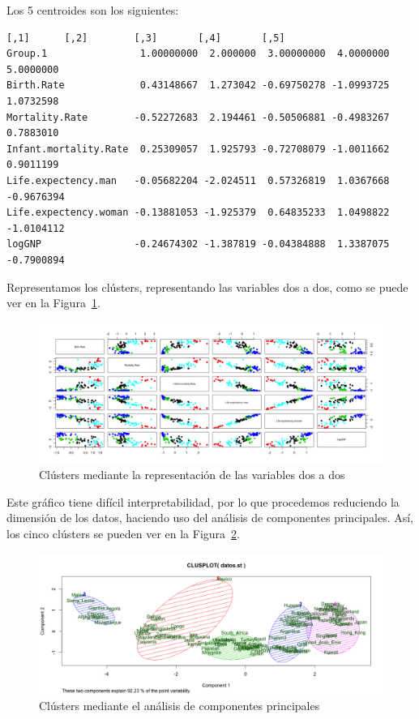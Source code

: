 \documentclass[12pt,a4paper,twoside,openright,titlepage,final]{article}
\begin{document}
Los 5 centroides son los siguientes:

\begin{Verbatim}[fontsize=\footnotesize]
                             [,1]      [,2]        [,3]       [,4]       [,5]
Group.1                1.00000000  2.000000  3.00000000  4.0000000  5.0000000
Birth.Rate             0.43148667  1.273042 -0.69750278 -1.0993725  1.0732598
Mortality.Rate        -0.52272683  2.194461 -0.50506881 -0.4983267  0.7883010
Infant.mortality.Rate  0.25309057  1.925793 -0.72708079 -1.0011662  0.9011199
Life.expectency.man   -0.05682204 -2.024511  0.57326819  1.0367668 -0.9676394
Life.expectency.woman -0.13881053 -1.925379  0.64835233  1.0498822 -1.0104112
logGNP                -0.24674302 -1.387819 -0.04384888  1.3387075 -0.7900894
\end{Verbatim}


Representamos los clústers, representando las variables dos a dos, como se puede ver en la Figura~\ref{fig:pairs_plot}.\\

\begin{figure}[tbph!]
\centering
\includegraphics[width=0.8\linewidth]{imagenes/pairs_plot}
\caption{Clústers mediante la representación de las variables dos a dos}
\label{fig:pairs_plot}
\end{figure}

Este gráfico tiene difícil interpretabilidad, por lo que procedemos reduciendo la dimensión de los datos, haciendo uso del análisis de componentes principales. Así, los cinco clústers se pueden ver en la Figura~\ref{fig:plot_5clusters}.\\

\begin{figure}[tbph!] 
\centering
\includegraphics[width=0.8\linewidth]{imagenes/plot_5clusters}
\caption{Clústers mediante el análisis de componentes principales}
\label{fig:plot_5clusters}
\end{figure}
\end{document}
